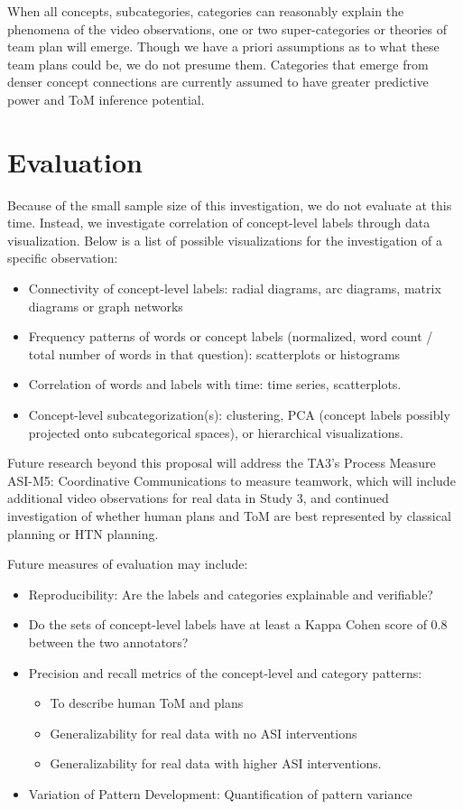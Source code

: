 When all concepts, subcategories, categories can reasonably explain the phenomena of the video observations, one or two super-categories or theories of team plan will emerge. Though we have a priori assumptions as to what these team plans could be, we do not presume them. Categories that emerge from denser concept connections are currently assumed to have greater predictive power and ToM inference potential.


\section{Evaluation}

Because of the small sample size of this investigation, we do not evaluate at this time. Instead, we investigate correlation of concept-level labels through data visualization. Below is a list of possible visualizations for the investigation of a specific observation:
\begin{itemize}
    \item Connectivity of concept-level labels: radial diagrams, arc diagrams, matrix diagrams or graph networks
    \item Frequency patterns of words or concept labels (normalized, word count / total number of words in that question): scatterplots or histograms
    \item Correlation of words and labels with time: time series, scatterplots. 
    \item Concept-level subcategorization(s): clustering, PCA (concept labels possibly projected onto subcategorical spaces), or hierarchical visualizations.
\end{itemize}

Future research beyond this proposal will address the TA3’s Process Measure ASI-M5: Coordinative Communications to measure teamwork, which will include additional video observations for real data in Study 3, and continued investigation of whether human plans and ToM are best represented by classical planning or HTN planning. 

Future measures of evaluation may include:
\begin{itemize}
    \item Reproducibility: Are the labels and categories explainable and verifiable? 
    \item Do the sets of concept-level labels have at least a Kappa Cohen score of 0.8 between the two annotators?
    \item Precision and recall metrics of the concept-level and category patterns:
    \begin{itemize}
        \item To describe human ToM and plans
        \item Generalizability for real data with no ASI interventions
        \item Generalizability for real data with higher ASI interventions.
    \end{itemize}
    \item Variation of Pattern Development: Quantification of pattern variance 
\end{itemize}


